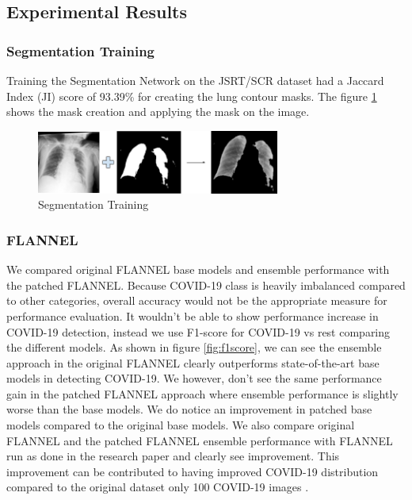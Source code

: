 \documentclass{sigkddExp}
\begin{document}
\subsection{Experimental Results}
\subsubsection{Segmentation Training}
Training the Segmentation Network on the JSRT/SCR dataset had a Jaccard Index
(JI) score of 93.39\% for creating the lung contour masks. The figure \ref{fig:segtrain}
shows the mask creation and applying the mask on the image.

\begin{figure}[h]
    \includegraphics[width=8cm]{../doc/images/segmentation_training.png}
    \caption{Segmentation Training}
    \label{fig:segtrain}
\end{figure}

\subsubsection{FLANNEL}

We compared original FLANNEL base models and ensemble performance with the
patched FLANNEL. Because COVID-19 class is heavily imbalanced compared to other
categories, overall accuracy would not be the appropriate measure for
performance evaluation. It wouldn’t be able to show performance increase in
COVID-19 detection, instead we use F1-score for COVID-19 vs rest comparing the
different models.  As shown in figure \ref{fig:f1score}, we can see the ensemble
approach in the original FLANNEL clearly outperforms state-of-the-art base
models in detecting COVID-19. We however, don’t see the same performance gain in
the patched FLANNEL approach where ensemble performance is slightly worse than
the base models. We do notice an improvement in patched base models compared to
the original base models. We also compare original FLANNEL and the patched
FLANNEL ensemble performance with FLANNEL run as done in the research paper and
clearly see improvement. This improvement can be contributed to having improved
COVID-19 distribution compared to the original dataset only 100 COVID-19 images
\cite{10.1093/jamia/ocaa280}.
\end{document}
